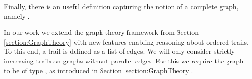 \begin{isabellebody}
\begin{isamarkuptext}
Finally, there is an useful definition capturing the notion of a complete graph, namely .%
\end{isamarkuptext}\isamarkuptrue%
%
\isadelimdocument
%
\endisadelimdocument
%
\isatagdocument
%
\isamarkuptrue%
%
\endisatagdocument
{\isafolddocument}%
%
\isadelimdocument
%
\endisadelimdocument
%
\begin{isamarkuptext}%
\label{section:trails} In our work we extend the graph theory framework from Section \ref{section:GraphTheory} 
with new features enabling reasoning about ordered trails. To this end,
 a trail is defined as a list of edges. We will only consider strictly increasing trails 
on graphs without parallel edges. For this we require the graph 
to be of type , as introduced in Section \ref{section:GraphTheory}. 


\end{isamarkuptext}
\end{isabellebody}
